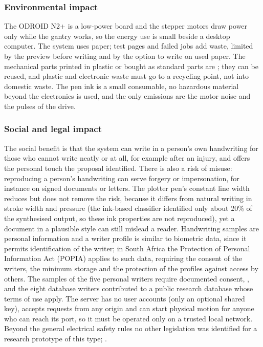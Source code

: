     \subsubsection{Environmental impact}

        The ODROID N2+ is a low-power board and the stepper motors draw power only while the gantry works, so the energy use is small beside a desktop computer.
        The system uses paper; test pages and failed jobs add waste, limited by the preview before writing and by the option to write on used paper.
        The mechanical parts printed in plastic or bought as standard parts are ; they can be reused, and plastic and electronic waste must go to a recycling point, not into domestic waste.
        The pen ink is a small consumable, no hazardous material beyond the electronics is used, and the only emissions are the motor noise and the pulses of the drive.

    \subsubsection{Social and legal impact}

        The social benefit is that the system can write in a person's own handwriting for those who cannot write neatly or at all, for example after an injury, and offers the personal touch the proposal identified.
        There is also a risk of misuse: reproducing a person's handwriting can serve forgery or impersonation, for instance on signed documents or letters.
        The plotter pen's constant line width reduces but does not remove the risk, because it differs from natural writing in stroke width and pressure (the ink-based classifier identified only about 20\% of the synthesised output, so these ink properties are not reproduced), yet a document in a plausible style can still mislead a reader.
        Handwriting samples are personal information and a writer profile is similar to biometric data, since it permits identification of the writer; in South Africa the Protection of Personal Information Act (POPIA) applies to such data, requiring the consent of the writers, the minimum storage and the protection of the profiles against access by others.
        The samples of the five personal writers require documented consent, , and the eight database writers contributed to a public research database whose terms of use apply.
        The server has no user accounts (only an optional shared key), accepts requests from any origin and can start physical motion for anyone who can reach its port, so it must be operated only on a trusted local network.
        Beyond the general electrical safety rules no other legislation was identified for a research prototype of this type; .

